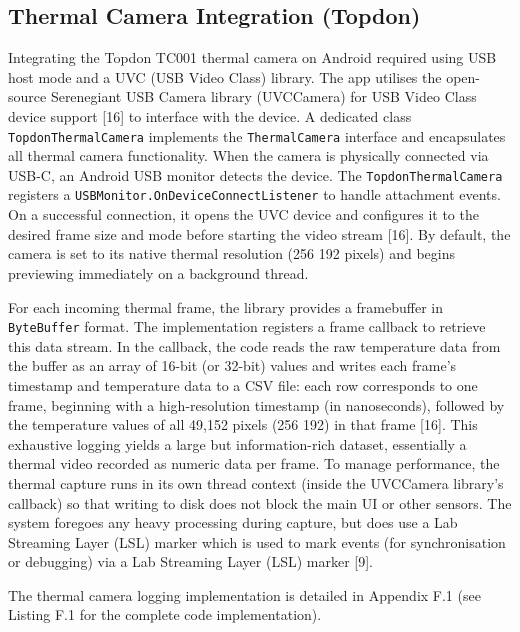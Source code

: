 \subsection{Thermal Camera Integration (Topdon)}\label{sec:4-2-1}
Integrating the Topdon TC001 thermal camera on Android required using USB host mode and a UVC (USB Video Class) library. The app utilises the open-source Serenegiant USB Camera library (UVCCamera) for USB Video Class device support [16] to interface with the device. A dedicated class \texttt{TopdonThermalCamera} implements the \texttt{ThermalCamera} interface and encapsulates all thermal camera functionality. When the camera is physically connected via USB-C, an Android USB monitor detects the device. The \texttt{TopdonThermalCamera} registers a \texttt{USBMonitor.OnDeviceConnectListener} to handle attachment events. On a successful connection, it opens the UVC device and configures it to the desired frame size and mode before starting the video stream [16]. By default, the camera is set to its native thermal resolution (256\,\texttimes\,192 pixels) and begins previewing immediately on a background thread.

For each incoming thermal frame, the library provides a framebuffer in \texttt{ByteBuffer} format. The implementation registers a frame callback to retrieve this data stream. In the callback, the code reads the raw temperature data from the buffer as an array of 16-bit (or 32-bit) values and writes each frame's timestamp and temperature data to a CSV file: each row corresponds to one frame, beginning with a high-resolution timestamp (in nanoseconds), followed by the temperature values of all 49{,}152 pixels (256\,\texttimes\,192) in that frame [16]. This exhaustive logging yields a large but information-rich dataset, essentially a thermal video recorded as numeric data per frame. To manage performance, the thermal capture runs in its own thread context (inside the UVCCamera library's callback) so that writing to disk does not block the main UI or other sensors. The system foregoes any heavy processing during capture, but does use a Lab Streaming Layer (LSL) marker which is used to mark events (for synchronisation or debugging) via a Lab Streaming Layer (LSL) marker [9].

The thermal camera logging implementation is detailed in Appendix F.1 (see Listing F.1 for the complete code implementation).

